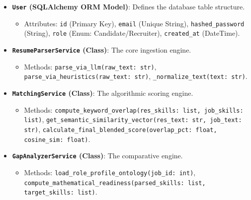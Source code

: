 \documentclass[12pt,a4paper]{report}
\begin{document}
\begin{itemize}
    \item \textbf{\texttt{User} (SQLAlchemy ORM Model)}: Defines the database table structure.
      \begin{itemize}
          \item Attributes: \texttt{id} (Primary Key), \texttt{email} (Unique String), \texttt{hashed\_password} (String), \texttt{role} (Enum: Candidate/Recruiter), \texttt{created\_at} (DateTime).
      \end{itemize}
    \item \textbf{\texttt{ResumeParserService} (Class)}: The core ingestion engine.
      \begin{itemize}
          \item Methods: \texttt{parse\_via\_llm(raw\_text: str)}, \texttt{parse\_via\_heuristics(raw\_text: str)}, \texttt{\_normalize\_text(text: str)}.
      \end{itemize}
    \item \textbf{\texttt{MatchingService} (Class)}: The algorithmic scoring engine.
      \begin{itemize}
          \item Methods: \texttt{compute\_keyword\_overlap(res\_skills: list, job\_skills: list)}, \texttt{get\_semantic\_similarity\_vector(res\_text: str, job\_text: str)}, \texttt{calculate\_final\_blended\_score(overlap\_pct: float, cosine\_sim: float)}.
      \end{itemize}
    \item \textbf{\texttt{GapAnalyzerService} (Class)}: The comparative engine.
      \begin{itemize}
          \item Methods: \texttt{load\_role\_profile\_ontology(job\_id: int)}, \texttt{compute\_mathematical\_readiness(parsed\_skills: list, target\_skills: list)}.
      \end{itemize}
\end{itemize}
\end{document}
